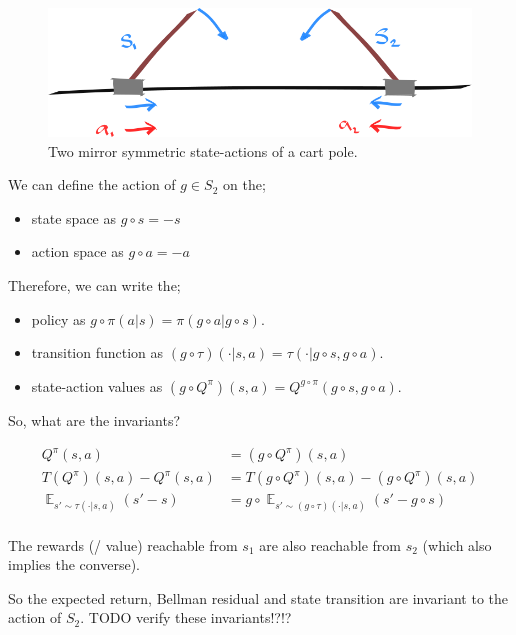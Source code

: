\begin{figure}[h!]
	\centering
	\includegraphics[width=1\textwidth,height=0.25\textheight]{../../pictures/drawings/cart-pole-mirror.png}
	\caption{Two mirror symmetric state-actions of a cart pole.}
\end{figure}

We can define the action of $g \in S_2$ on the;

\begin{itemize}
	\tightlist
	\item state space as $g \circ s = -s$
	\item action space as $g \circ a = -a$
\end{itemize}

Therefore, we can write the;
\begin{itemize}
	\tightlist
 	\item policy as $g \circ \pi(a | s) = \pi(g \circ a | g \circ s)$.
	\item transition function as $(g \circ \tau)(\cdot | s, a) = \tau(\cdot| g \circ s, g \circ a)$.
  \item state-action values as $(g \circ Q^{\pi})(s, a) = Q^{g \circ \pi}(g \circ s, g \circ a)$.
\end{itemize}

So, what are the invariants?

\begin{align*}
Q^\pi(s, a) &= (g \circ Q^{\pi})(s, a) \tag{expected return}\\
T(Q^\pi)(s,a) - Q^\pi(s,a) &=T(g \circ Q^\pi)(s, a) - (g \circ Q^\pi)(s,a) \tag{Bellman residual}\\
\mathop{\mathbb E}_{s' \sim \tau(\cdot| s, a)} (s' - s) &= g \circ \mathop{\mathbb E}_{s' \sim (g \circ \tau)(\cdot| s, a)} (s' - g \circ s) \tag{change in state}\\
\end{align*}

The rewards (/ value) reachable from $s_1$ are also reachable from $s_2$ (which also implies the converse).

So the expected return, Bellman residual and state transition are invariant to the action of $S_2$.
{\color{red}TODO verify these invariants!?!?}


